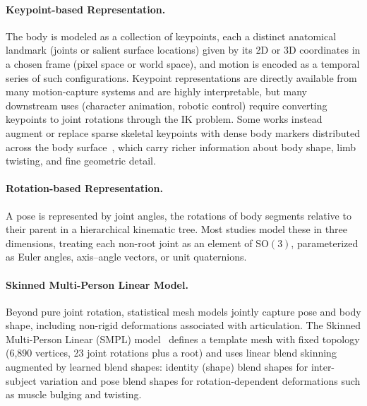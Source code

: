 \paragraph{Keypoint-based Representation.} The body is modeled as a collection of keypoints, each a distinct anatomical landmark (joints or salient surface locations) given by its 2D or 3D coordinates in a chosen frame (pixel space or world space), and motion is encoded as a temporal series of such configurations.
Keypoint representations are directly available from many motion-capture systems and are highly interpretable, but many downstream uses (character animation, robotic control) require converting keypoints to joint rotations through the IK problem.
Some works instead augment or replace sparse skeletal keypoints with dense body markers distributed across the body surface~\cite{WuWZZHYT22, TaheriCBT22}, which carry richer information about body shape, limb twisting, and fine geometric detail.

\paragraph{Rotation-based Representation.} A pose is represented by joint angles, the rotations of body segments relative to their parent in a hierarchical kinematic tree. Most studies model these in three dimensions, treating each non-root joint as an element of $\mathrm{SO}(3)$, parameterized as Euler angles, axis--angle vectors, or unit quaternions.

\paragraph{Skinned Multi-Person Linear Model.} Beyond pure joint rotation, statistical mesh models jointly capture pose and body shape, including non-rigid deformations associated with articulation.
The Skinned Multi-Person Linear (SMPL) model~\cite{loper2015smpl} defines a template mesh with fixed topology (6{,}890 vertices, 23 joint rotations plus a root) and uses linear blend skinning augmented by learned blend shapes: identity (shape) blend shapes for inter-subject variation and pose blend shapes for rotation-dependent deformations such as muscle bulging and twisting.



